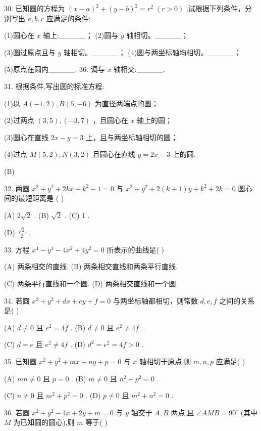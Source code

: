 \documentclass[10pt]{article}
\begin{document}
30. 已知圆的方程为 \({\left( x - a\right) }^{2} + {\left( y - b\right) }^{2} = {r}^{2}\;\left( {r > 0}\right)\) ,试根据下列条件，分别写出 \(a,b,r\) 应满足的条件:

(1)圆心在 \(x\) 轴上:\_\_\_\_\_； (2)圆与 \(y\) 轴相切。\_\_\_\_\_；

(3)圆过原点且与 \(y\) 轴相切。\_\_\_\_\_； (4)圆与两坐标轴均相切。\_\_\_\_\_；

(5)原点在圆内\_\_\_\_\_. 36. 调与 \(x\) 轴相交:\_\_\_\_\_.

31. 根据条件,写出圆的标准方程:

(1)以 \(A\left( {-1,2}\right) ,B\left( {5, - 6}\right)\) 为直径两端点的圆；

(2)过两点 \(\left( {3,5}\right) ,\left( {-3,7}\right)\) ，且圆心在 \(x\) 轴上的圆；

(3)圆心在直线 \({2x} - y = 3\) 上，且与两坐标轴相切的圆；

(4)过点 \(M\left( {5,2}\right) ,N\left( {3,2}\right)\) 且圆心在直线 \(y = {2x} - 3\) 上的圆.

(B)

32. 两圆 \({x}^{2} + {y}^{2} + {2kx} + {k}^{2} - 1 = 0\) 与 \({x}^{2} + {y}^{2} + 2\left( {k + 1}\right) y + {k}^{2} + {2k} = 0\) 圆心间的最短距离是 ( )

(A) \(2\sqrt{2}\) . (B) \(\sqrt{2}\) . (C) 1 .

(D) \(\frac{\sqrt{2}}{2}\) .

33. 方程 \({x}^{4} - {y}^{4} - 4{x}^{2} + 4{y}^{2} = 0\) 所表示的曲线是( )

(A) 两条相交的直线. (B) 两条相交直线和两条平行直线.

(C) 两条平行直线和一个圆. (D) 两条相交直线和一个圆.

34. 若圆 \({x}^{2} + {y}^{2} + {dx} + {ey} + f = 0\) 与两坐标轴都相切，则常数 \(d,e,f\) 之间的关系是( )

(A) \(d \neq  0\) 且 \({e}^{2} = {4f}\) . (B) \(d \neq  0\) 且 \({e}^{2} \neq  {4f}\) .

(C) \(d = e\) 且 \({e}^{2} \neq  {4f}\) . (D) \({d}^{2} = {e}^{2} = {4f} > 0\) .

35. 已知圆 \({x}^{2} + {y}^{2} + {mx} + {ny} + p = 0\) 与 \(x\) 轴相切于原点,则 \(m,n,p\) 应满足( )

(A) \({mn} \neq  0\) 且 \(p = 0\) . (B) \(m \neq  0\) 且 \({n}^{2} + {p}^{2} = 0\) .

(C) \(n \neq  0\) 且 \({m}^{2} + {p}^{2} = 0\) . (D) \(p \neq  0\) 且 \({m}^{2} + {n}^{2} = 0\) .

36. 若圆 \({x}^{2} + {y}^{2} - {4x} + {2y} + m = 0\) 与 \(y\) 轴交于 \(A,B\) 两点,且 \(\angle {AMB} = {90}^{ \circ  }\) (其中 \(M\) 为已知圆的圆心),则 \(m\) 等于( )
\end{document}
